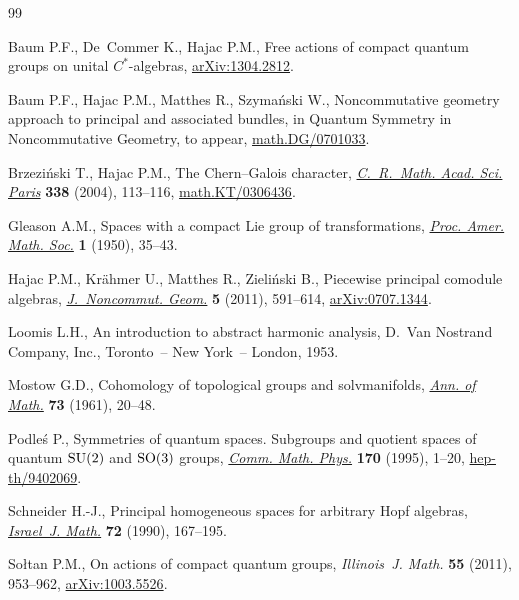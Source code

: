 \documentclass[pdftex]{sigma}
\begin{document}
\begin{thebibliography}{99}
\footnotesize\itemsep=0pt

Baum P.F., De~Commer K., Hajac P.M., Free actions of compact quantum groups on
  unital $C^{*}$-algebras, \href{http://arxiv.org/abs/1304.2812}{arXiv:1304.2812}.

Baum P.F., Hajac P.M., Matthes R., Szyma\'nski W., Noncommutative geometry
  approach to principal and associated bundles, in Quantum Symmetry in
  Noncommutative Geometry, {t}o appear, \href{http://arxiv.org/abs/math.DG/0701033}{math.DG/0701033}.

Brzezi{\'n}ski T., Hajac P.M., The {C}hern--{G}alois character,
  \href{http://dx.doi.org/10.1016/j.crma.2003.11.009}{\textit{C.~R.~Math. Acad. Sci. Paris}} \textbf{338} (2004), 113--116,
  \href{http://arxiv.org/abs/math.KT/0306436}{math.KT/0306436}.

Gleason A.M., Spaces with a compact {L}ie group of transformations,
  \href{http://dx.doi.org/10.1090/S0002-9939-1950-0033830-7}{\textit{Proc. Amer. Math. Soc.}} \textbf{1} (1950), 35--43.

Hajac P.M., Kr{\"a}hmer U., Matthes R., Zieli{\'n}ski B., Piecewise principal
  comodule algebras, \href{http://dx.doi.org/10.4171/JNCG/88}{\textit{J.~Noncommut. Geom.}} \textbf{5} (2011), 591--614,
  \href{http://arxiv.org/abs/0707.1344}{arXiv:0707.1344}.

Loomis L.H., An introduction to abstract harmonic analysis, D.~Van Nostrand
  Company, Inc., Toronto~-- New York~-- London, 1953.

Mostow G.D., Cohomology of topological groups and solvmanifolds, \href{http://dx.doi.org/10.2307/1970281}{\textit{Ann.
  of Math.}} \textbf{73} (1961), 20--48.

Podle{\'s} P., Symmetries of quantum spaces. {S}ubgroups and quotient spaces of
  quantum {${\rm SU}(2)$} and {${\rm SO}(3)$} groups, \href{http://dx.doi.org/10.1007/BF02099436}{\textit{Comm. Math.
  Phys.}} \textbf{170} (1995), 1--20, \href{http://arxiv.org/abs/hep-th/9402069}{hep-th/9402069}.

Schneider H.-J., Principal homogeneous spaces for arbitrary {H}opf algebras,
  \href{http://dx.doi.org/10.1007/BF02764619}{\textit{Israel~J. Math.}} \textbf{72} (1990), 167--195.

So{\l}tan P.M., On actions of compact quantum groups, \textit{Illinois~J.
  Math.} \textbf{55} (2011), 953--962, \href{http://arxiv.org/abs/1003.5526}{arXiv:1003.5526}.

\end{thebibliography}\LastPageEnding
\end{document}
